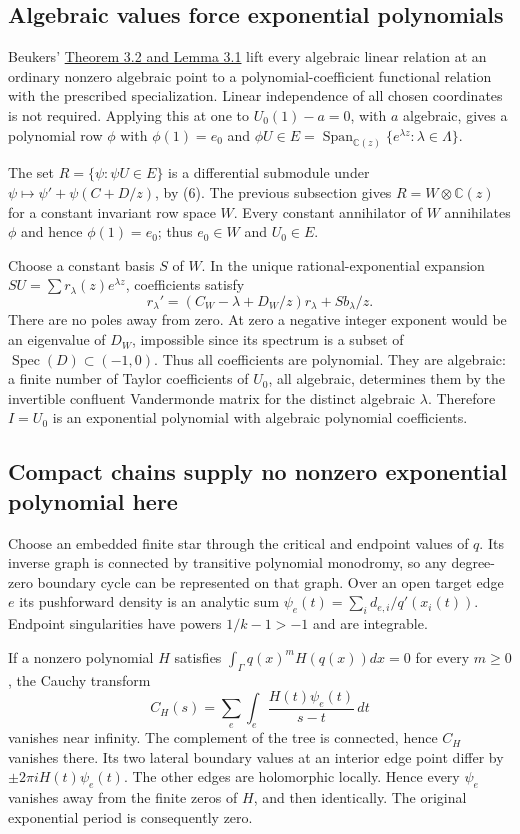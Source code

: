 \documentclass[11pt]{article}
\DeclareMathOperator{\Span}{Span}
\DeclareMathOperator{\Spec}{Spec}
\newcommand{\C}{\mathbb C}
\begin{document}
\subsection{Algebraic values force exponential polynomials}
Beukers' \href{https://arxiv.org/html/math/0405549}{Theorem 3.2 and Lemma 3.1}
lift every algebraic linear relation at an ordinary nonzero algebraic
point to a polynomial-coefficient functional relation with the prescribed
specialization. Linear independence of all chosen coordinates is not
required. Applying this at one to $U_0(1)-a=0$, with $a$ algebraic, gives
a polynomial row $\phi$ with $\phi(1)=e_0$ and
$\phi U\in E=\Span_{\C(z)}\{e^{\lambda z}:\lambda\in\Lambda\}$.

The set $R=\{\psi:\psi U\in E\}$ is a differential submodule under
$\psi\mapsto\psi'+\psi(C+D/z)$, by (6). The previous subsection gives
$R=W\otimes\C(z)$ for a constant invariant row space $W$.
Every constant annihilator of $W$ annihilates $\phi$ and hence
$\phi(1)=e_0$; thus $e_0\in W$ and $U_0\in E$.

Choose a constant basis $S$ of $W$. In the unique rational-exponential
expansion $SU=\sum r_\lambda(z)e^{\lambda z}$, coefficients satisfy
\[
 r_\lambda'=(C_W-\lambda+D_W/z)r_\lambda+Sb_\lambda/z.        \tag{9}
\]
There are no poles away from zero. At zero a negative integer exponent
would be an eigenvalue of $D_W$, impossible since its spectrum is a subset
of $\Spec(D)\subset(-1,0)$. Thus all coefficients are polynomial.
They are algebraic: a finite number of Taylor coefficients of $U_0$,
all algebraic, determines them by the invertible confluent Vandermonde
matrix for the distinct algebraic $\lambda$. Therefore $I=U_0$ is an
exponential polynomial with algebraic polynomial coefficients.

\subsection{Compact chains supply no nonzero exponential polynomial here}
Choose an embedded finite star through the critical and endpoint values
of $q$. Its inverse graph is connected by transitive polynomial monodromy,
so any degree-zero boundary cycle can be represented on that graph.
Over an open target edge $e$ its pushforward density is an analytic sum
$\psi_e(t)=\sum_i d_{e,i}/q'(x_i(t))$. Endpoint singularities have powers
$1/k-1>-1$ and are integrable.

If a nonzero polynomial $H$ satisfies
$\int_\Gamma q(x)^mH(q(x))dx=0$ for every $m\ge0$, the Cauchy transform
\[
 C_H(s)=\sum_e\int_e\frac{H(t)\psi_e(t)}{s-t}\,dt
\]
vanishes near infinity. The complement of the tree is connected, hence
$C_H$ vanishes there. Its two lateral boundary values at an interior edge
point differ by $\pm2\pi i H(t)\psi_e(t)$. The other edges are holomorphic
locally. Hence every $\psi_e$ vanishes away from the finite zeros of $H$,
and then identically. The original exponential period is consequently zero.
\end{document}
